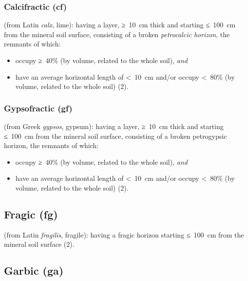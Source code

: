 \documentclass[
  letterpaper,
  DIV=11,
  numbers=noendperiod]{scrreprt}
\providecommand{\tightlist}{%
  \setlength{\itemsep}{0pt}\setlength{\parskip}{0pt}}\usepackage{longtable,booktabs,array}
\begin{document}
\hypertarget{calcifractic-cf}{%
\subsubsection{Calcifractic (cf)}\label{calcifractic-cf}}

(from Latin \emph{calx}, lime): having a layer, ≥~10~cm thick and
starting ≤~100~cm from the mineral soil surface, consisting of a broken
\emph{petrocalcic horizon}, the remnants of which:

\begin{itemize}
\tightlist
\item
  occupy ≥~40\% (by volume, related to the whole soil), \emph{and}
\item
  have an average horizontal length of \textless~10~cm and/or occupy
  \textless~80\% (by volume, related to the whole soil) (2).
\end{itemize}

\hypertarget{gypsofractic-gf}{%
\subsubsection{Gypsofractic (gf)}\label{gypsofractic-gf}}

(from Greek \emph{gypsos}, gypsum): having a layer, ≥~10~cm thick and
starting ≤~100~cm from the mineral soil surface, consisting of a broken
petrogypsic horizon, the remnants of which:

\begin{itemize}
\tightlist
\item
  occupy ≥~40\% (by volume, related to the whole soil), \emph{and}
\item
  have an average horizontal length of \textless~10~cm and/or occupy
  \textless~80\% (by volume, related to the whole soil) (2).
\end{itemize}

\hypertarget{fragic-fg}{%
\subsection{Fragic (fg)}\label{fragic-fg}}

(from Latin \emph{fragilis}, fragile): having a fragic horizon starting
≤~100~cm from the mineral soil surface (2).

\hypertarget{garbic-ga}{%
\subsection{Garbic (ga)}\label{garbic-ga}}
\end{document}

